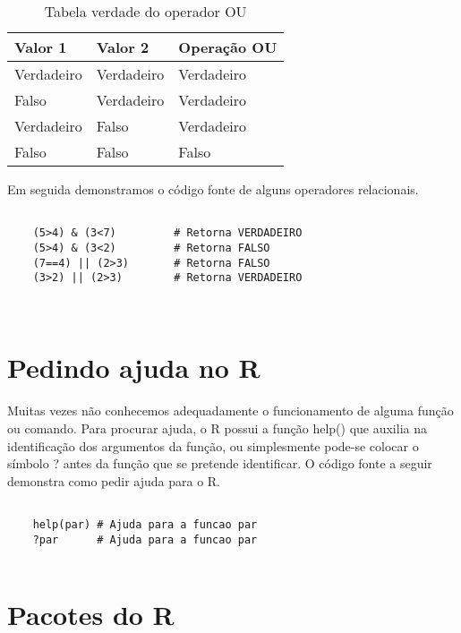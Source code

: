 \FloatBarrier
\begin{table}[h]
	\centering
	\begin{tabular}{@{}lll@{}}
		\toprule
		Valor 1    & Valor 2    & Operação OU \\ \midrule
		Verdadeiro & Verdadeiro & Verdadeiro \\
		Falso      & Verdadeiro & Verdadeiro     \\
		Verdadeiro & Falso      & Verdadeiro     \\
		Falso      & Falso      & Falso      \\ \bottomrule
	\end{tabular}
	\caption{Tabela verdade do operador OU}
	\label{tab_verd_OU}
\end{table}
\FloatBarrier

Em seguida demonstramos o código fonte de alguns operadores relacionais.

\begin{scriptsize}
	\estiloR
	\begin{lstlisting}[]
	
	(5>4) & (3<7)         # Retorna VERDADEIRO
	(5>4) & (3<2)         # Retorna FALSO 
	(7==4) || (2>3)       # Retorna FALSO
	(3>2) || (2>3)        # Retorna VERDADEIRO
	
	
	\end{lstlisting}
\end{scriptsize}

\section{Pedindo ajuda no R} 


Muitas vezes não conhecemos adequadamente o funcionamento de alguma função ou comando. Para procurar ajuda, o R possui a função help() que auxilia na identificação dos argumentos da função, ou simplesmente pode-se colocar o símbolo ? antes da função que se pretende identificar. O código fonte a seguir demonstra como pedir ajuda para o R. 

\begin{scriptsize}
	\estiloR
	\begin{lstlisting}[]
	
	help(par) # Ajuda para a funcao par 
	?par      # Ajuda para a funcao par 
	
	\end{lstlisting}
\end{scriptsize} 

\section{Pacotes do R}

